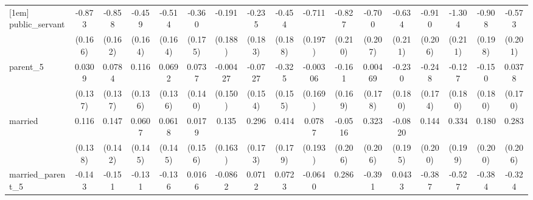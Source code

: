 {\begin{tabular}{l*{16}{c}}
[1em]
public\_servant      &      -0.873\sym{***}&      -0.858\sym{***}&      -0.459\sym{**} &      -0.514\sym{**} &      -0.360\sym{*}  &      -0.191         &      -0.235         &      -0.454\sym{*}  &      -0.711\sym{***}&      -0.827\sym{***}&      -0.700\sym{***}&      -0.634\sym{**} &      -0.910\sym{***}&      -1.304\sym{***}&      -0.908\sym{***}&      -0.573\sym{**} \\
                    &     (0.166)         &     (0.162)         &     (0.164)         &     (0.164)         &     (0.175)         &     (0.188)         &     (0.183)         &     (0.188)         &     (0.197)         &     (0.210)         &     (0.207)         &     (0.211)         &     (0.206)         &     (0.211)         &     (0.198)         &     (0.201)         \\
[1em]
parent\_5            &      0.0309         &      0.0784         &       0.116         &      0.0692         &      0.0737         &    -0.00427         &     -0.0727         &      -0.325\sym{*}  &    -0.00306         &      -0.161         &     0.00469         &      -0.230         &      -0.248         &      -0.127         &      -0.150         &      0.0378         \\
                    &     (0.137)         &     (0.137)         &     (0.136)         &     (0.136)         &     (0.140)         &     (0.150)         &     (0.154)         &     (0.155)         &     (0.169)         &     (0.169)         &     (0.178)         &     (0.180)         &     (0.174)         &     (0.180)         &     (0.180)         &     (0.170)         \\
[1em]
married             &       0.116         &       0.147         &      0.0607         &      0.0618         &      0.0179         &       0.135         &       0.296         &       0.414\sym{*}  &      0.0787         &     -0.0516         &       0.323         &     -0.0820         &       0.144         &       0.334         &       0.180         &       0.283         \\
                    &     (0.138)         &     (0.142)         &     (0.145)         &     (0.145)         &     (0.156)         &     (0.163)         &     (0.173)         &     (0.179)         &     (0.193)         &     (0.206)         &     (0.206)         &     (0.195)         &     (0.200)         &     (0.199)         &     (0.200)         &     (0.206)         \\
[1em]
married\_parent\_5    &      -0.143         &      -0.151         &      -0.131         &      -0.136         &      0.0166         &     -0.0862         &      0.0712         &      0.0723         &     -0.0640         &       0.286         &      -0.391         &      0.0433         &      -0.387         &      -0.527         &      -0.384         &      -0.324         \\

\end{tabular}}
